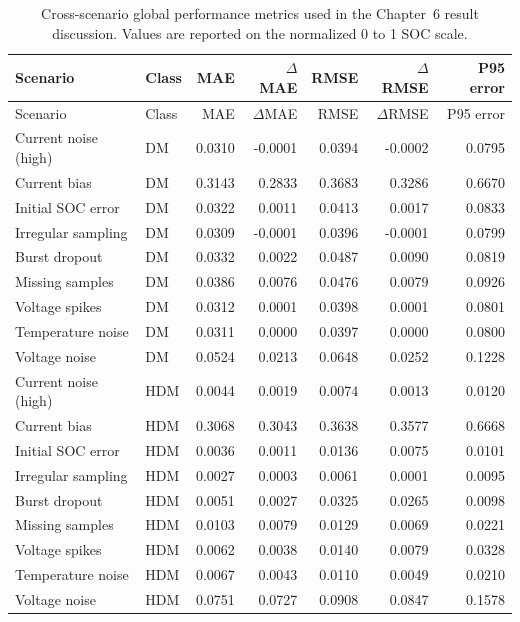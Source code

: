 \documentclass[
    a4paper,
    12pt,
    titlepage,
    bibliography=totoc,
    twoside=on,
    parskip=false,
    numbers=noenddot,
    cleardoublepage=empty,
    DIV=12,
    BCOR=12.0mm,
    headheight=36pt,
    headings=openright
]{scrreprt}
\begin{document}
\begin{longtable}{p{2.4cm}p{1.3cm}rrrrr}
\caption[Cross-scenario global robustness metrics.]{Cross-scenario global performance metrics used in the Chapter~6 result discussion. Values are reported on the normalized 0 to 1 SOC scale.}\label{tab:robustness_appendix_key_results}\\
\toprule
Scenario & Class & MAE & $\Delta$MAE & RMSE & $\Delta$RMSE & P95 error \\
\midrule
\endfirsthead
\toprule
Scenario & Class & MAE & $\Delta$MAE & RMSE & $\Delta$RMSE & P95 error \\
\midrule
\endhead
Current noise (high) & DM & 0.0310 & -0.0001 & 0.0394 & -0.0002 & 0.0795 \\
Current bias & DM & 0.3143 & 0.2833 & 0.3683 & 0.3286 & 0.6670 \\
Initial SOC error & DM & 0.0322 & 0.0011 & 0.0413 & 0.0017 & 0.0833 \\
Irregular sampling & DM & 0.0309 & -0.0001 & 0.0396 & -0.0001 & 0.0799 \\
Burst dropout & DM & 0.0332 & 0.0022 & 0.0487 & 0.0090 & 0.0819 \\
Missing samples & DM & 0.0386 & 0.0076 & 0.0476 & 0.0079 & 0.0926 \\
Voltage spikes & DM & 0.0312 & 0.0001 & 0.0398 & 0.0001 & 0.0801 \\
Temperature noise & DM & 0.0311 & 0.0000 & 0.0397 & 0.0000 & 0.0800 \\
Voltage noise & DM & 0.0524 & 0.0213 & 0.0648 & 0.0252 & 0.1228 \\
Current noise (high) & HDM & 0.0044 & 0.0019 & 0.0074 & 0.0013 & 0.0120 \\
Current bias & HDM & 0.3068 & 0.3043 & 0.3638 & 0.3577 & 0.6668 \\
Initial SOC error & HDM & 0.0036 & 0.0011 & 0.0136 & 0.0075 & 0.0101 \\
Irregular sampling & HDM & 0.0027 & 0.0003 & 0.0061 & 0.0001 & 0.0095 \\
Burst dropout & HDM & 0.0051 & 0.0027 & 0.0325 & 0.0265 & 0.0098 \\
Missing samples & HDM & 0.0103 & 0.0079 & 0.0129 & 0.0069 & 0.0221 \\
Voltage spikes & HDM & 0.0062 & 0.0038 & 0.0140 & 0.0079 & 0.0328 \\
Temperature noise & HDM & 0.0067 & 0.0043 & 0.0110 & 0.0049 & 0.0210 \\
Voltage noise & HDM & 0.0751 & 0.0727 & 0.0908 & 0.0847 & 0.1578 \\

\end{longtable}
\end{document}
